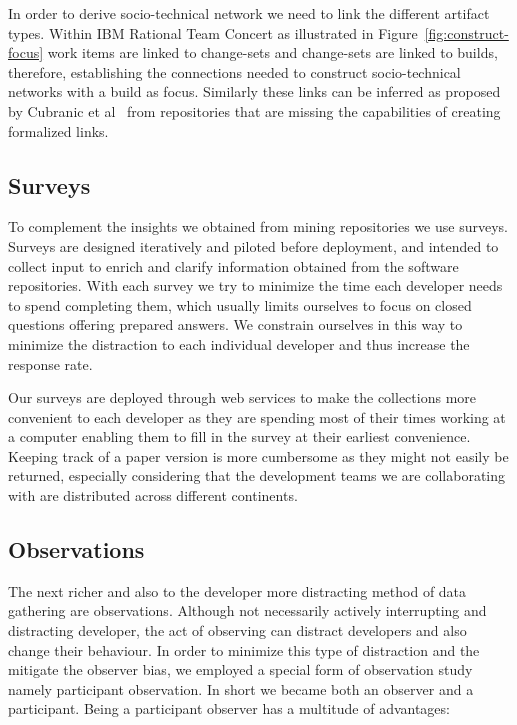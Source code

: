 In order to derive socio-technical network we need to link the different artifact types.
Within IBM Rational Team Concert as illustrated in Figure~\ref{fig:construct-focus} work items are linked to change-sets and change-sets are linked to builds, therefore, establishing the connections needed to construct socio-technical networks with a build as focus.
Similarly these links can be inferred as proposed by Cubranic et al~\cite{cubranic:tse:2005} from repositories that are missing the capabilities of creating formalized links.

\subsection{Surveys}
To complement the insights we obtained from mining repositories we use surveys.
Surveys are designed iteratively and piloted before deployment, and intended to collect input to enrich and clarify information obtained from the software repositories. 
With each survey we try to minimize the time each developer needs to spend completing them, which usually limits ourselves to focus on closed questions offering prepared answers.
We constrain ourselves in this way to minimize the distraction to each individual developer and thus increase the response rate.

Our surveys are deployed through web services to make the collections more convenient to each developer as they are spending most of their times working at a computer enabling them to fill in the survey at their earliest convenience.
Keeping track of a paper version is more cumbersome as they might not easily be returned, especially considering that the development teams we are collaborating with are distributed across different continents.


\subsection{Observations}
The next richer and also to the developer more distracting method of data gathering are observations.
Although not necessarily actively interrupting and distracting developer, the act of observing can distract developers and also change their behaviour.
In order to minimize this type of distraction and the mitigate the observer bias, we employed a special form of observation study namely participant observation.
In short we became both an observer and a participant.
%
Being a participant observer has a multitude of advantages:

